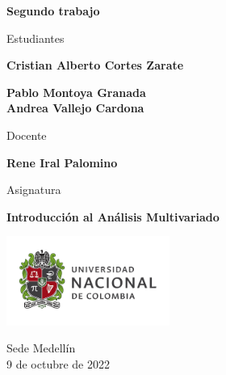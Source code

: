 \begin{titlepage}
   \Large{
   \begin{center}
       \vspace*{1cm}

       \textbf{Segundo trabajo}

            
       \vspace{1.5cm}
       
       Estudiantes
       
       \vspace{0.5cm}
        
	\textbf{Cristian Alberto Cortes Zarate}        

       \textbf{Pablo Montoya Granada} \\

	\textbf{Andrea Vallejo Cardona}

              \vspace{1cm}
       
       Docente
       
       \vspace{0.5cm}

       \textbf{Rene Iral Palomino}
       
       \vspace{0.4cm}

       \vspace{1.4cm}
       
       Asignatura
       
       \vspace{0.5cm}

       \textbf{Introducción al Análisis Multivariado}

       \vfill

            
       \vspace{0.4cm}
     
       \includegraphics[width=0.4\textwidth]{logounal.png}
            
       Sede Medellín\\
       9 de octubre de 2022
       
   \end{center}
   }
\end{titlepage}